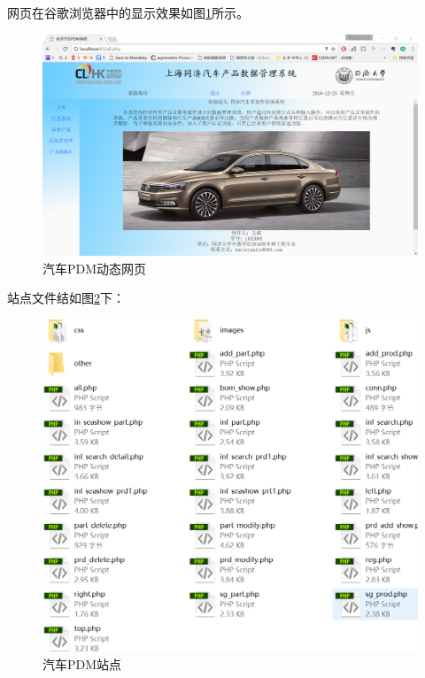  网页在谷歌浏览器中的显示效果如图\ref{fig:index}所示。
\begin{figure}[H]
\centering
\includegraphics[width=0.9\linewidth]{figure/index}
\caption{汽车PDM动态网页}
\label{fig:index}
\end{figure}
 
站点文件结如图\ref{fig:webSite}下：
\begin{figure}[H]
\centering
\includegraphics[width=0.8\linewidth]{figure/webSite}
\caption{汽车PDM站点}
\label{fig:webSite}
\end{figure}
